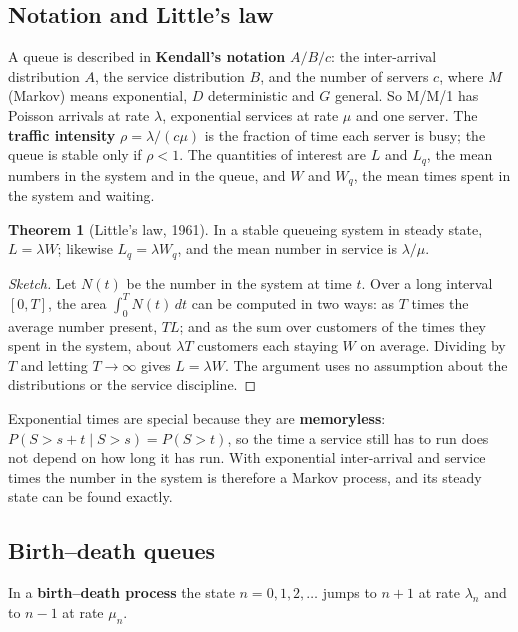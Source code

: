 \documentclass[11pt,a4paper]{article}
\numberwithin{equation}{section}
\theoremstyle{definition}
\newtheorem{thm}{Theorem}[subsection]
\begin{document}
\subsection{Notation and Little's law}
\label{ssec:little}

A queue is described in \textbf{Kendall's notation} $A/B/c$: the inter-arrival distribution $A$, the service distribution $B$, and the number of servers $c$, where $M$ (Markov) means exponential, $D$ deterministic and $G$ general. So M/M/1 has Poisson arrivals at rate $\lambda$, exponential services at rate $\mu$ and one server. The
\textbf{traffic intensity} $\rho = \lambda/(c\mu)$ is the fraction of time each server is busy; the queue is stable only if $\rho < 1$. The quantities of interest are $L$ and $L_q$, the mean numbers in the system and in the queue, and $W$ and $W_q$, the mean times spent in the system and waiting.

\begin{thm}[Little's law, 1961]
\label{thm:little}
In a stable queueing system in steady state, $L = \lambda W$; likewise $L_q = \lambda W_q$, and the mean number in service is $\lambda/\mu$.
\end{thm}

\begin{proof}[Sketch]
Let $N(t)$ be the number in the system at time $t$. Over a long interval $[0, T]$, the area $\int_0^TN(t)\,dt$ can be computed in two ways: as $T$ times the average number present, $TL$; and as the sum over customers of the times they spent in the system, about $\lambda T$ customers each staying $W$ on average. Dividing by $T$ and letting
$T \to \infty$ gives $L = \lambda W$. The argument uses no assumption about the distributions or the service discipline.
\end{proof}

Exponential times are special because they are \textbf{memoryless}: $P(S > s + t \mid S > s) = P(S > t)$, so the time a service still has to run does not depend on how long it has run. With exponential inter-arrival and service times the number in the system is therefore a Markov process, and its steady state can be found exactly.

\subsection{Birth--death queues}
\label{ssec:birthdeath}

In a \textbf{birth--death process} the state $n = 0, 1, 2, \ldots$ jumps to $n + 1$ at rate $\lambda_n$ and to $n - 1$ at rate $\mu_n$.
\end{document}
